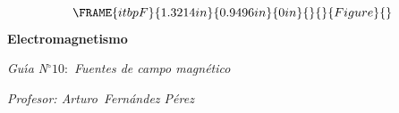 \documentclass[12pt]{article}
\begin{document}
\begin{center}
\begin{equation*}
\FRAME{itbpF}{1.3214in}{0.9496in}{0in}{}{}{Figure}{\special{language
"Scientific Word";type "GRAPHIC";maintain-aspect-ratio TRUE;display
"USEDEF";valid_file "T";width 1.3214in;height 0.9496in;depth
0in;original-width 1.3552in;original-height 0.9669in;cropleft "0";croptop
"1";cropright "1";cropbottom "0";tempfilename
'R3IG7W00.bmp';tempfile-properties "XPR";}}
\end{equation*}%
\textbf{Electromagnetismo}

\emph{Gu\'{\i}a N}$%
{{}^\circ}%
10:$ \emph{Fuentes de campo magn\'{e}tico}

\textit{Profesor: Arturo\ Fern\'{a}ndez P\'{e}rez}
\end{center}
\end{document}
